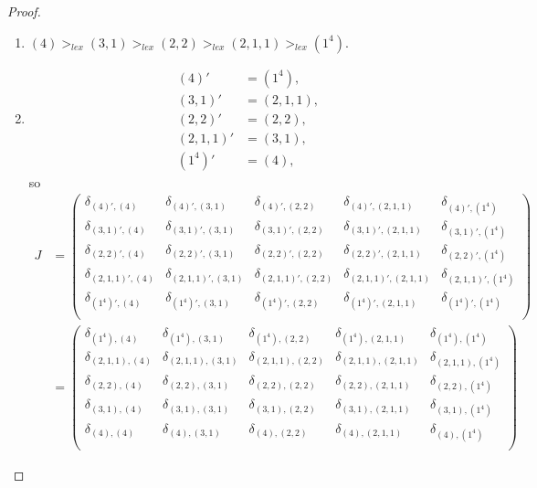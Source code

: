 \documentclass[12pt]{extarticle}
\newcommand{\<}{\langle}
\renewcommand{\>}{\rangle}
\theoremstyle{definition}
\begin{document}
\begin{proof}
  \begin{enumerate}
  \item
    $(4) >_{lex} (3,1) >_{lex} (2,2) >_{lex} (2,1,1) >_{lex} (1^4)$.
  \item
    \begin{align*}
      (4)' &= (1^4), \\
      (3,1)' &= (2,1,1), \\
      (2,2)'&=(2,2), \\
      (2,1,1)'&=(3,1), \\
      (1^4)'&=(4) ,
    \end{align*}
    so
    \begin{align*}
      J
      &=
      \begin{pmatrix}
        \delta_{(4)', (4)} & \delta_{(4)', (3,1)} & \delta_{(4)', (2,2)} & \delta_{(4)', (2,1,1)} & \delta_{(4)', (1^4)}  \\
        \delta_{(3,1)', (4)} & \delta_{(3,1)', (3,1)} & \delta_{(3,1)', (2,2)} & \delta_{(3,1)', (2,1,1)} & \delta_{(3,1)', (1^4)}  \\
        \delta_{(2,2)', (4)} & \delta_{(2,2)', (3,1)} & \delta_{(2,2)', (2,2)} & \delta_{(2,2)', (2,1,1)} & \delta_{(2,2)', (1^4)}  \\
        \delta_{(2,1,1)', (4)} & \delta_{(2,1,1)', (3,1)} & \delta_{(2,1,1)', (2,2)} & \delta_{(2,1,1)', (2,1,1)} & \delta_{(2,1,1)', (1^4)}  \\
        \delta_{(1^4)', (4)} & \delta_{(1^4)', (3,1)} & \delta_{(1^4)', (2,2)} & \delta_{(1^4)', (2,1,1)} & \delta_{(1^4)', (1^4)}  \\
      \end{pmatrix} \\
      &=
      \begin{pmatrix}
        \delta_{(1^4), (4)} & \delta_{(1^4), (3,1)} & \delta_{(1^4), (2,2)} & \delta_{(1^4), (2,1,1)} & \delta_{(1^4), (1^4)}  \\
        \delta_{(2,1,1), (4)} & \delta_{(2,1,1), (3,1)} & \delta_{(2,1,1), (2,2)} & \delta_{(2,1,1), (2,1,1)} & \delta_{(2,1,1), (1^4)}  \\
        \delta_{(2,2), (4)} & \delta_{(2,2), (3,1)} & \delta_{(2,2), (2,2)} & \delta_{(2,2), (2,1,1)} & \delta_{(2,2), (1^4)}  \\
        \delta_{(3,1), (4)} & \delta_{(3,1), (3,1)} & \delta_{(3,1), (2,2)} & \delta_{(3,1), (2,1,1)} & \delta_{(3,1), (1^4)}  \\
        \delta_{(4), (4)} & \delta_{(4), (3,1)} & \delta_{(4), (2,2)} & \delta_{(4), (2,1,1)} & \delta_{(4), (1^4)}  \\

\end{pmatrix}
\end{align*}
\end{enumerate}
\end{proof}
\end{document}
